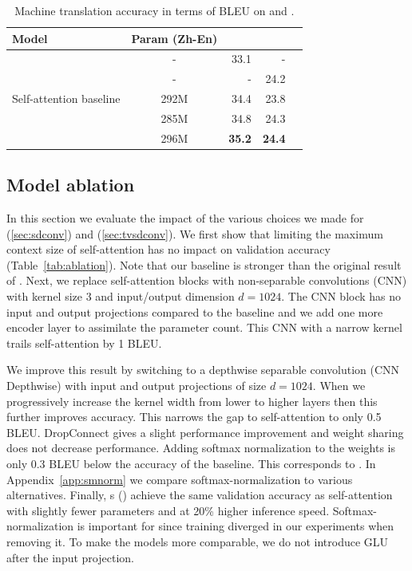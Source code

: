 \begin{table}[t]
\centering
\begin{tabular}{lcrrr}
\toprule
Model & Param (Zh-En) & \iwslt{} & \zhen{} \\
\midrule
\citet{deng2018latent} & - & 33.1 & - \\
\cite{hassan2018parity} & - & - & 24.2 \\
\midrule
Self-attention baseline & 292M & 34.4 & 23.8 \\
\sdconv{} & 285M & 34.8 & 24.3 \\
\tvsdconv{} & 296M & \textbf{35.2} & \textbf{24.4} \\
\bottomrule
\end{tabular}
\caption{Machine translation accuracy in terms of BLEU on \iwslt{} and \zhen{}.}
\label{tab:mt2}
\end{table}



\subsection{Model ablation}\label{sec:ablation}

In this section we evaluate the impact of the various choices we made for \sdconv{} (\textsection\ref{sec:sdconv}) and \tvsdconv{} (\textsection\ref{sec:tvsdconv}).
We first show that limiting the maximum context size of self-attention has no impact on validation accuracy (Table~\ref{tab:ablation}).
Note that our baseline is stronger than the original result of \citet{vaswani2017transformer}.
Next, we replace self-attention blocks with non-separable convolutions (CNN) with kernel size 3 and input/output dimension $d=1024$. 
The CNN block has no input and output projections compared to the baseline and we add one more encoder layer to assimilate the parameter count. 
This CNN with a narrow kernel trails self-attention by 1 BLEU.

We improve this result by switching to a depthwise separable convolution (CNN Depthwise) with input and output projections of size $d=1024$. 
When we progressively increase the kernel width from lower to higher layers then this further improves accuracy. 
This narrows the gap to self-attention to only 0.5 BLEU.
DropConnect gives a slight performance improvement and weight sharing does not decrease performance.
Adding softmax normalization to the weights is only 0.3 BLEU below the accuracy of the baseline. 
This corresponds to \sdconv{}.
In Appendix~\ref{app:smnorm} we compare softmax-normalization to various alternatives.
Finally, \tvsdconvfull{}s (\tvsdconv{}) achieve the same validation accuracy as self-attention with slightly fewer parameters and at 20\% higher inference speed.
Softmax-normalization is important for \tvsdconv{} since training diverged in our experiments when removing it.
To make the models more comparable, we do not introduce GLU after the input projection.

